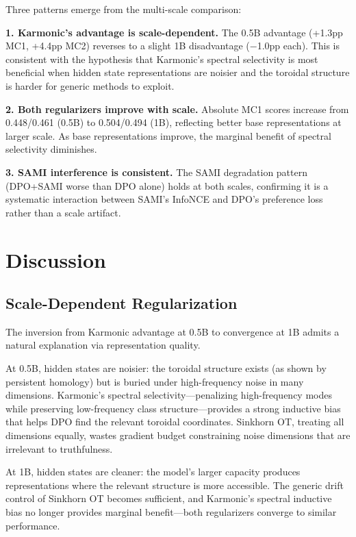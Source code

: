 \documentclass[11pt,a4paper]{article}
\begin{document}
Three patterns emerge from the multi-scale comparison:

\textbf{1. Karmonic's advantage is scale-dependent.} The 0.5B advantage (+1.3pp MC1, +4.4pp MC2) reverses to a slight 1B disadvantage ($-$1.0pp each). This is consistent with the hypothesis that Karmonic's spectral selectivity is most beneficial when hidden state representations are noisier and the toroidal structure is harder for generic methods to exploit.

\textbf{2. Both regularizers improve with scale.} Absolute MC1 scores increase from 0.448/0.461 (0.5B) to 0.504/0.494 (1B), reflecting better base representations at larger scale. As base representations improve, the marginal benefit of spectral selectivity diminishes.

\textbf{3. SAMI interference is consistent.} The SAMI degradation pattern (DPO+SAMI worse than DPO alone) holds at both scales, confirming it is a systematic interaction between SAMI's InfoNCE and DPO's preference loss rather than a scale artifact.

\section{Discussion}

\subsection{Scale-Dependent Regularization}

The inversion from Karmonic advantage at 0.5B to convergence at 1B admits a natural explanation via representation quality.

At 0.5B, hidden states are noisier: the toroidal structure exists (as shown by persistent homology) but is buried under high-frequency noise in many dimensions. Karmonic's spectral selectivity---penalizing high-frequency modes while preserving low-frequency class structure---provides a strong inductive bias that helps DPO find the relevant toroidal coordinates. Sinkhorn OT, treating all dimensions equally, wastes gradient budget constraining noise dimensions that are irrelevant to truthfulness.

At 1B, hidden states are cleaner: the model's larger capacity produces representations where the relevant structure is more accessible. The generic drift control of Sinkhorn OT becomes sufficient, and Karmonic's spectral inductive bias no longer provides marginal benefit---both regularizers converge to similar performance.
\end{document}
